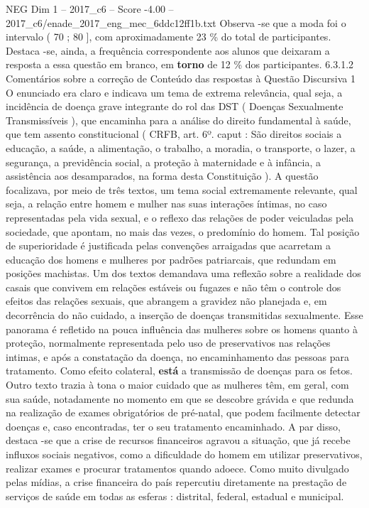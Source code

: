 \begin{textsample}{NEG Dim 1 – 2017\_c6 – Score -4.00 – 2017\_c6/enade\_2017\_eng\_mec\_6ddc12ff1b.txt}
Observa -se que a moda foi o intervalo ( 70 ; 80 ], com aproximadamente 23 \% do total de participantes.
Destaca -se, ainda, a frequência correspondente aos alunos que deixaram a resposta a essa questão em branco, em \textbf{torno} de 12 \% dos participantes. 6.3.1.2 Comentários sobre a correção de Conteúdo das respostas à Questão Discursiva 1 O enunciado era claro e indicava um tema de extrema relevância, qual seja, a incidência de doença grave integrante do rol das DST ( Doenças Sexualmente Transmissíveis ), que encaminha para a análise do direito fundamental à saúde, que tem assento constitucional ( CRFB, art. 6º. caput : São direitos sociais a educação, a saúde, a alimentação, o trabalho, a moradia, o transporte, o lazer, a segurança, a previdência social, a proteção à maternidade e à infância, a assistência aos desamparados, na forma desta Constituição ).
A questão focalizava, por meio de três textos, um tema social extremamente relevante, qual seja, a relação entre homem e mulher nas suas interações íntimas, no caso representadas pela vida sexual, e o reflexo das relações de poder veiculadas pela sociedade, que apontam, no mais das vezes, o predomínio do homem.
Tal posição de superioridade é justificada pelas convenções arraigadas que acarretam a educação dos homens e mulheres por padrões patriarcais, que redundam em posições machistas.
Um dos textos demandava uma reflexão sobre a realidade dos casais que convivem em relações estáveis ou fugazes e não têm o controle dos efeitos das relações sexuais, que abrangem a gravidez não planejada e, em decorrência do não cuidado, a inserção de doenças transmitidas sexualmente.
Esse panorama é refletido na pouca influência das mulheres sobre os homens quanto à proteção, normalmente representada pelo uso de preservativos nas relações intimas, e após a constatação da doença, no encaminhamento das pessoas para tratamento.
Como efeito colateral, \textbf{está} a transmissão de doenças para os fetos.
Outro texto trazia à tona o maior cuidado que as mulheres têm, em geral, com sua saúde, notadamente no momento em que se descobre grávida e que redunda na realização de exames obrigatórios de pré-natal, que podem facilmente detectar doenças e, caso encontradas, ter o seu tratamento encaminhado.
A par disso, destaca -se que a crise de recursos financeiros agravou a situação, que já recebe influxos sociais negativos, como a dificuldade do homem em utilizar preservativos, realizar exames e procurar tratamentos quando adoece.
Como muito divulgado pelas mídias, a crise financeira do país repercutiu diretamente na prestação de serviços de saúde em todas as esferas : distrital, federal, estadual e municipal.

\end{textsample}
